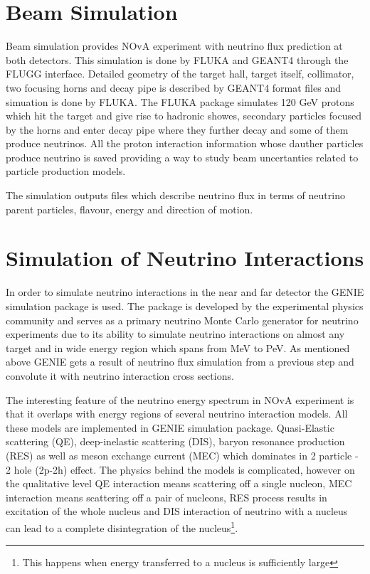 \section{Beam Simulation}
Beam simulation provides NOvA experiment with neutrino flux prediction at both detectors. 
This simulation is done by FLUKA and GEANT4 through the FLUGG interface. Detailed geometry of
the target hall, target itself, collimator, two focusing horns and decay pipe is described by
GEANT4 format files and simuation is done by FLUKA. The FLUKA package simulates 120 GeV protons
which hit the target and give rise to hadronic showes, secondary particles focused by the horns 
and enter decay pipe where they further decay and some of them produce neutrinos. All the proton 
interaction information whose dauther particles produce neutrino is saved providing a way to 
study beam uncertanties related to particle production models. 

The simulation outputs files which describe neutrino flux in terms of neutrino parent particles, 
flavour, energy and direction of motion.

\section{Simulation of Neutrino Interactions}
In order to simulate neutrino interactions in the near and far detector the GENIE simulation 
package is used. The package is developed by the experimental physics community and serves as a 
primary neutrino Monte Carlo generator for neutrino experiments due to its ability to simulate neutrino
interactions on almost any target and in wide energy region which spans from MeV to PeV. As mentioned 
above GENIE gets a result of neutrino flux simulation from a previous step and convolute it with
neutrino interaction cross sections.

The interesting feature of the neutrino energy spectrum in NOvA experiment is that it overlaps 
with energy regions of several neutrino interaction models. All these models are implemented in GENIE
simulation package. Quasi-Elastic scattering (QE), deep-inelastic scattering (DIS), baryon resonance 
production (RES) as well as meson exchange current (MEC) which dominates in 2 particle - 2 hole (2p-2h) 
effect. The physics behind the models is complicated, however on the qualitative level QE interaction 
means scattering off a single nucleon, MEC interaction means scattering off a pair of nucleons, RES process
results in excitation of the whole nucleus and DIS interaction of neutrino with a nucleus can lead to a 
complete disintegration of the nucleus\footnote{This happens when energy transferred to a nucleus is 
sufficiently large}.

